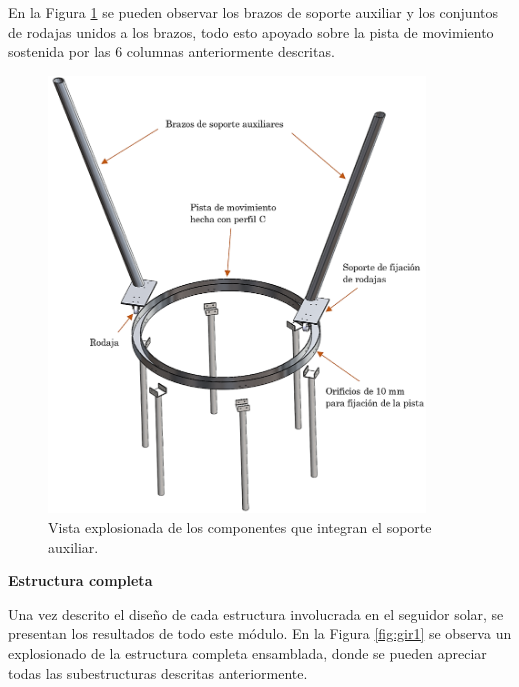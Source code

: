 En la Figura \ref{fig:rol5} se pueden observar los brazos de soporte auxiliar y los conjuntos de rodajas unidos a los brazos, todo esto apoyado sobre la pista de movimiento sostenida por las 6 columnas anteriormente descritas.

\begin{figure}[H]
	\centering
	\includegraphics[width=10cm]{imagenes/rol5}
	\caption{Vista explosionada de los componentes que integran el soporte auxiliar.}
	\label{fig:rol5}
\end{figure}

\newpage
\textbf{Estructura completa}

Una vez descrito el diseño de cada estructura involucrada en el seguidor solar, se presentan los resultados de todo este módulo. En la Figura \ref{fig:gir1} se observa un explosionado de la estructura completa ensamblada, donde se pueden apreciar todas las subestructuras descritas anteriormente.

